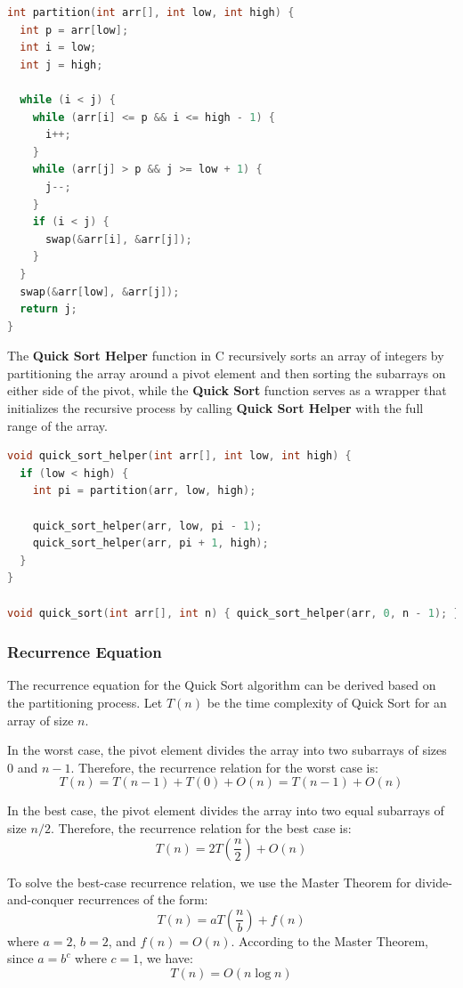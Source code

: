 \documentclass{article}
\begin{document}
\newpage
\begin{lstlisting}[language=C, caption=Partition implementation]
int partition(int arr[], int low, int high) {
  int p = arr[low];
  int i = low;
  int j = high;

  while (i < j) {
    while (arr[i] <= p && i <= high - 1) {
      i++;
    }
    while (arr[j] > p && j >= low + 1) {
      j--;
    }
    if (i < j) {
      swap(&arr[i], &arr[j]);
    }
  }
  swap(&arr[low], &arr[j]);
  return j;
}
\end{lstlisting}

The \textbf{Quick Sort Helper} function in C recursively sorts an array of integers by partitioning the array around a pivot element and then sorting the subarrays on either side of the pivot, while the \textbf{Quick Sort} function serves as a wrapper that initializes the recursive process by calling \textbf{Quick Sort Helper} with the full range of the array.

\begin{lstlisting}[language=C, caption=Quick Sort implementation]
void quick_sort_helper(int arr[], int low, int high) {
  if (low < high) {
    int pi = partition(arr, low, high);

    quick_sort_helper(arr, low, pi - 1);
    quick_sort_helper(arr, pi + 1, high);
  }
}

void quick_sort(int arr[], int n) { quick_sort_helper(arr, 0, n - 1); }
\end{lstlisting}

\newpage
\subsubsection{Recurrence Equation}
The recurrence equation for the Quick Sort algorithm can be derived based on the partitioning process. Let $T(n)$ be the time complexity of Quick Sort for an array of size $n$.

In the worst case, the pivot element divides the array into two subarrays of sizes $0$ and $n-1$. Therefore, the recurrence relation for the worst case is:
\[
	T(n) = T(n-1) + T(0) + O(n) = T(n-1) + O(n)
\]

In the best case, the pivot element divides the array into two equal subarrays of size $n/2$. Therefore, the recurrence relation for the best case is:
\[
	T(n) = 2T\left(\frac{n}{2}\right) + O(n)
\]

To solve the best-case recurrence relation, we use the Master Theorem for divide-and-conquer recurrences of the form:
\[
	T(n) = aT\left(\frac{n}{b}\right) + f(n)
\]
where $a = 2$, $b = 2$, and $f(n) = O(n)$. According to the Master Theorem, since $a = b^c$ where $c = 1$, we have:
\[
	T(n) = O(n \log n)
\]
\end{document}
